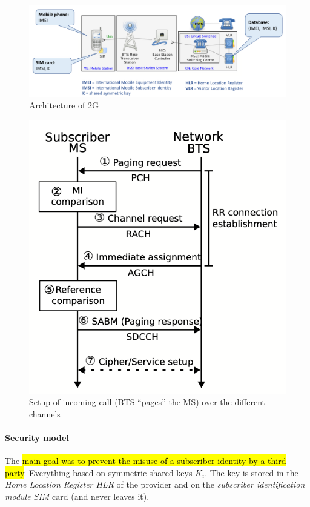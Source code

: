 \begin{figure}[h]
	\centering
	\includegraphics[scale=0.45]{images/10-2g-arch.png}
	\caption{Architecture of 2G}%
	\label{fig:2g-arch}
\end{figure}

\begin{figure}[h]
	\centering
	\includegraphics[scale=0.4]{images/10-2g-channels.png}
	\caption{Setup of incoming call (BTS ``pages'' the MS) over the different channels}%
	\label{fig:2g-channels}
\end{figure}

\paragraph{Security model}
The \hl{main goal was to prevent the misuse of a subscriber identity by a third
	party}. Everything based on symmetric shared keys $K_i$. The key is stored in
the \textit{Home Location Register HLR} of the provider and on the
\textit{subscriber identification module SIM} card (and never leaves it).

